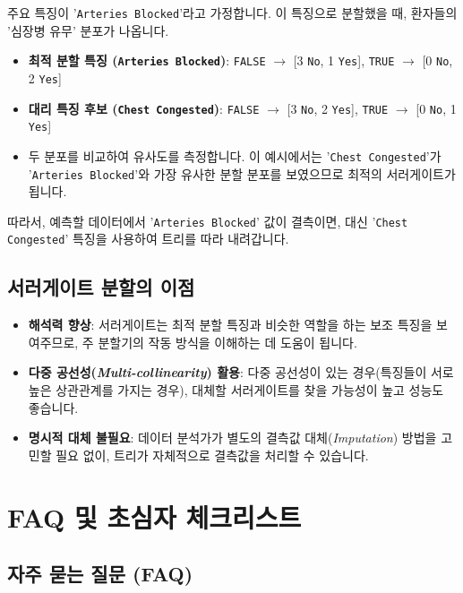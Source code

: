 \documentclass[11pt,a4paper]{book}
\theoremstyle{definition}
\begin{document}
\begin{tcolorbox}[examplebox, title={서러게이트 분할 예시}]
주요 특징이 '\texttt{Arteries Blocked}'라고 가정합니다. 이 특징으로 분할했을 때, 환자들의 '심장병 유무' 분포가 나옵니다.
\begin{itemize}
    \item \textbf{최적 분할 특징 (\texttt{Arteries Blocked})}: \texttt{FALSE} $\rightarrow$ [3 \texttt{No}, 1 \texttt{Yes}], \texttt{TRUE} $\rightarrow$ [0 \texttt{No}, 2 \texttt{Yes}]
    \item \textbf{대리 특징 후보 (\texttt{Chest Congested})}: \texttt{FALSE} $\rightarrow$ [3 \texttt{No}, 2 \texttt{Yes}], \texttt{TRUE} $\rightarrow$ [0 \texttt{No}, 1 \texttt{Yes}]
    \item 두 분포를 비교하여 유사도를 측정합니다. 이 예시에서는 '\texttt{Chest Congested}'가 '\texttt{Arteries Blocked}'와 가장 유사한 분할 분포를 보였으므로 최적의 서러게이트가 됩니다.
\end{itemize}
따라서, 예측할 데이터에서 '\texttt{Arteries Blocked}' 값이 결측이면, 대신 '\texttt{Chest Congested}' 특징을 사용하여 트리를 따라 내려갑니다.
\end{tcolorbox}

\subsection{서러게이트 분할의 이점}
\begin{itemize}
    \item \textbf{해석력 향상}: 서러게이트는 최적 분할 특징과 비슷한 역할을 하는 보조 특징을 보여주므로, 주 분할기의 작동 방식을 이해하는 데 도움이 됩니다.
    \item \textbf{다중 공선성(\emph{Multi-collinearity}) 활용}: 다중 공선성이 있는 경우(특징들이 서로 높은 상관관계를 가지는 경우), 대체할 서러게이트를 찾을 가능성이 높고 성능도 좋습니다.
    \item \textbf{명시적 대체 불필요}: 데이터 분석가가 별도의 결측값 대체(\emph{Imputation}) 방법을 고민할 필요 없이, 트리가 자체적으로 결측값을 처리할 수 있습니다.
\end{itemize}


\section{FAQ 및 초심자 체크리스트}

\subsection{자주 묻는 질문 (FAQ)}
\end{document}
